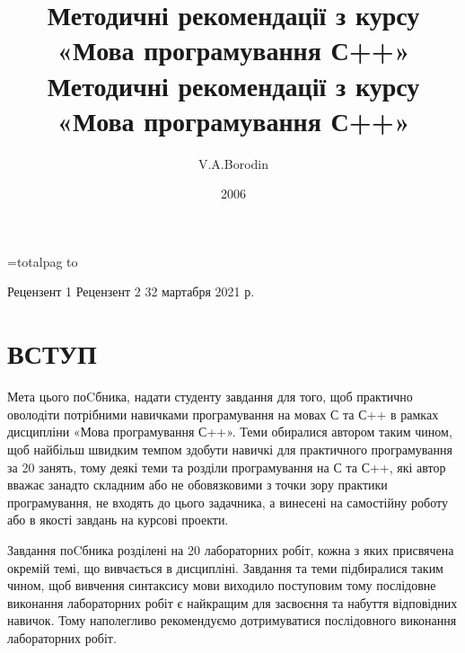 \documentclass[a5paper,titlepage,openany,twoside,draft]{book_unv}%
\date{}
\begin{document}
\titlepage
\author{V.A.Borodin}
\title{Методичні рекомендації з курсу «Мова програмування С++» }
\date{2006}
\maketitle


=totalpag
 to \totalpag
{}
\title{Методичні рекомендації з курсу «Мова програмування С++» }%
\secondpage%
{\totalpag}
{Рецензент 1}%
{Рецензент 2}%
{32 мартабря 2021 р.}%
\setcounter{page}{2}
\tableofcontents


\chapter*{ ВСТУП }

Мета цього поCбника, надати студенту завдання для того, щоб практично
оволодіти потрібними навичками програмування на мовах С та С++ в рамках
дисципліни «Мова програмування С++». Теми обиралися автором таким чином,
щоб найбільш швидким темпом здобути навичкі для практичного
програмування за 20 занять, тому деякі теми та розділи програмування на
С та С++, які автор вважає занадто складним або не обовязковими з точки
зору практики програмування, не входять до цього задачника, а винесені
на самостійну роботу або в якості завдань на курсові проекти.

Завдання поCбника розділені на 20 лабораторних робіт, кожна з яких
присвячена окремій темі, що вивчається в дисципліні. Завдання та теми
підбиралися таким чином, щоб вивчення синтаксису мови виходило
поступовим тому послідовне виконання лабораторних робіт є найкращим для
засвоєння та набуття відповідних навичок. Тому наполегливо рекомендуємо
дотримуватися послідовного виконання лабораторних робіт.
\end{document}
